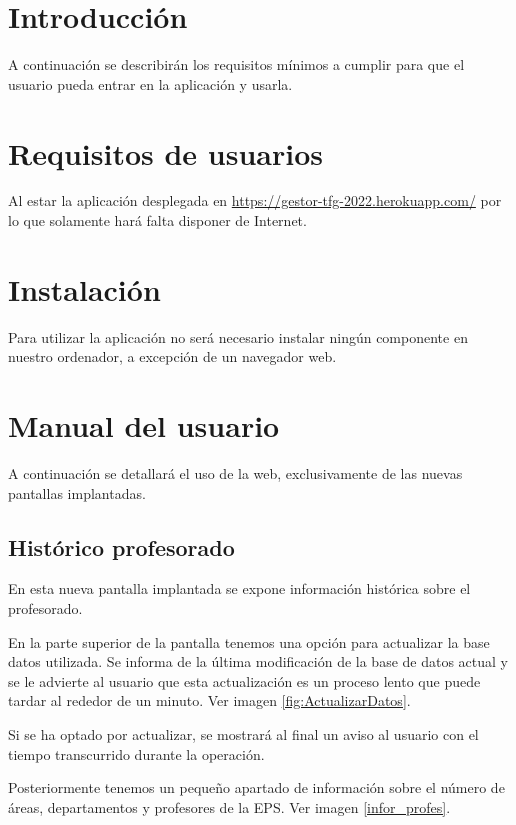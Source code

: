 
\section{Introducción}
A continuación se describirán los requisitos mínimos a cumplir para que el usuario pueda entrar en la aplicación y usarla.

\section{Requisitos de usuarios}
 Al estar la aplicación desplegada en \href{https://gestor-tfg-2022.herokuapp.com/}{https://gestor-tfg-2022.herokuapp.com/} por lo que solamente hará falta disponer de Internet.
\section{Instalación}
Para utilizar la aplicación no será necesario instalar ningún componente en nuestro ordenador, a excepción de un navegador web.
\section{Manual del usuario}
A continuación se detallará el uso de la web, exclusivamente de las nuevas pantallas implantadas.
\subsection{Histórico profesorado}
En esta nueva pantalla implantada se expone información histórica sobre el profesorado.

En la parte superior de la pantalla tenemos una opción para actualizar la base datos utilizada. Se informa de la última modificación de la base de datos actual y se le advierte al usuario que esta actualización es un proceso lento que puede tardar al rededor de un minuto. Ver imagen \ref{fig:ActualizarDatos}.


Si se ha optado por actualizar, se mostrará al final un aviso al usuario con el tiempo transcurrido durante la operación. %


Posteriormente tenemos un pequeño apartado de información sobre el número de áreas, departamentos y profesores de la EPS. Ver imagen \ref{infor_profes}.

